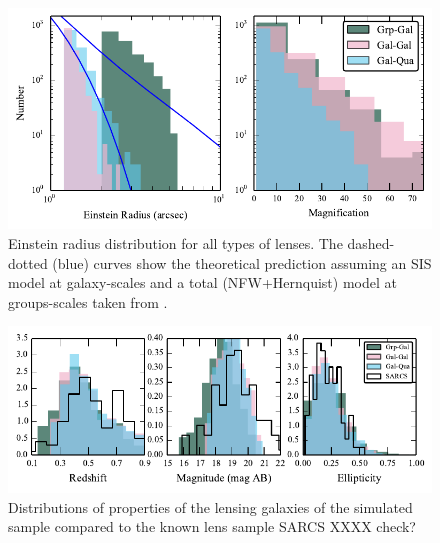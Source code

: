 \documentclass[useAMS,usenatbib,a4paper]{mn2e}
\begin{document}
\begin{figure}
\begin{center}
\includegraphics[scale=0.85]{sw-cfhtls-figs/distrib_remu.pdf}
\caption{ \label{fig:remudist}
Einstein radius distribution for all types of lenses. The dashed-dotted (blue)
curves show the theoretical prediction assuming an SIS model at galaxy-scales
and a total (NFW+Hernquist) model at groups-scales taken from \citep{More2012}.
}
\end{center}
\end{figure}

\begin{figure}
\begin{center}
\includegraphics[scale=1.3]{sw-cfhtls-figs/lensprop.pdf}
\caption{ \label{fig:lensprop}
Distributions of properties of the lensing galaxies of the simulated
sample compared to the known lens sample SARCS XXXX check? 
}
\end{center}
\end{figure}


%
%
\end{document}
